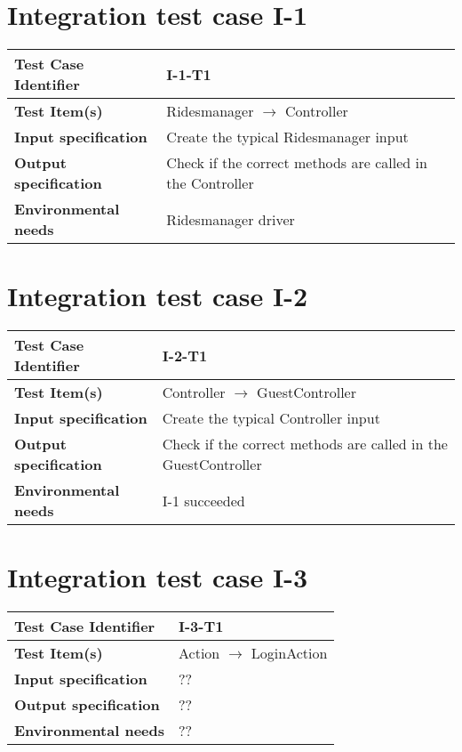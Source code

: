 \section{Integration test case I-1}
\begin{tabular*}{1.23\textwidth}{ l l }
 \textbf{Test Case Identifier}		& I-1-T1 \\
 \hline
 \textbf{Test Item(s)}			& Ridesmanager $\rightarrow$ Controller \\
 \hline
 \textbf{Input specification}		& Create the typical Ridesmanager input \\
 \hline
 \textbf{Output specification}		& Check if the correct methods are called in the Controller \\
 \hline
 \textbf{Environmental needs}		& Ridesmanager driver \\
\end{tabular*}

\section{Integration test case I-2}
\begin{tabular*}{1.23\textwidth}{ l l }
 \textbf{Test Case Identifier}		& I-2-T1 \\
 \hline
 \textbf{Test Item(s)}			& Controller $\rightarrow$ GuestController \\
 \hline
 \textbf{Input specification}		& Create the typical Controller input \\
 \hline
 \textbf{Output specification}		& Check if the correct methods are called in the GuestController \\
 \hline
 \textbf{Environmental needs}		& I-1 succeeded \\
\end{tabular*}

\section{Integration test case I-3}
\begin{tabular*}{1.23\textwidth}{ l l }
 \textbf{Test Case Identifier}		& I-3-T1 \\
 \hline
 \textbf{Test Item(s)}			& Action $\rightarrow$ LoginAction \\
 \hline
 \textbf{Input specification}		& ?? \\
 \hline
 \textbf{Output specification}		& ?? \\
 \hline
 \textbf{Environmental needs}		& ?? \\
\end{tabular*}


